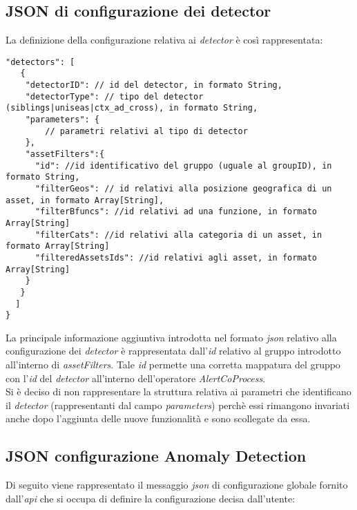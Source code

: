 \subsection{JSON di configurazione dei detector}\label{sec:json-detectors}
La definizione della configurazione relativa ai \textit{detector} è così rappresentata:
\begin{verbatim}
"detectors": [
   {
    "detectorID": // id del detector, in formato String, 
    "detectorType": // tipo del detector (siblings|uniseas|ctx_ad_cross), in formato String, 
    "parameters": {
		// parametri relativi al tipo di detector    
    },
    "assetFilters":{
      "id": //id identificativo del gruppo (uguale al groupID), in formato String,
      "filterGeos": // id relativi alla posizione geografica di un asset, in formato Array[String],
      "filterBfuncs": //id relativi ad una funzione, in formato Array[String]
      "filterCats": //id relativi alla categoria di un asset, in formato Array[String]
      "filteredAssetsIds": //id relativi agli asset, in formato Array[String]
    }
   }
  ]
}
\end{verbatim}
La principale informazione aggiuntiva introdotta nel formato \textit{\gls{json}} relativo alla configurazione dei \textit{detector} è rappresentata dall'\textit{id} relativo al gruppo introdotto all'interno di \textit{assetFilters}. Tale \textit{id} permette una corretta mappatura del gruppo con l'\textit{id} del \textit{detector} all'interno dell'operatore \textit{AlertCoProcess}.\\
Si è deciso di non rappresentare la struttura relativa ai parametri che identificano il \textit{detector} (rappresentanti dal campo \textit{parameters}) perchè essi rimangono invariati anche dopo l'aggiunta delle nuove funzionalità e sono scollegate da essa.

\subsection{JSON configurazione Anomaly Detection}
Di seguito viene rappresentato il messaggio \textit{\gls{json}} di configurazione globale fornito dall'\textit{\gls{api}} che si occupa di definire la configurazione decisa dall'utente:

